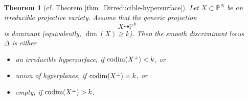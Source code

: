 \documentclass[12pt]{amsart}
\newtheorem{theorem}{Theorem}[section]
\begin{document}
\begin{theorem}[cf.  Theorem \ref{thm_Dirreducible-hypersurface}]\label{Thm2proof}
 Let $X\subset \mathbb P^N$ be an irreducible projective variety. Assume that the generic projection 
  $$X\dashrightarrow \mathbb P^k$$
  is dominant (equivalently, $\dim(X)\ge k$). Then the smooth discriminant locus $\Delta$ is either 
    \begin{itemize}
    \item[(i)] an irreducible hypersurface, if $\textup{codim}(X^{\perp})<k$, or
    \item[(ii)]  union of hyperplanes, if $\textup{codim}(X^{\perp})=k$, or
    \item[(iii)]  empty, if $\textup{codim}(X^{\perp})>k$.
    \end{itemize}
\end{theorem}
\end{document}
